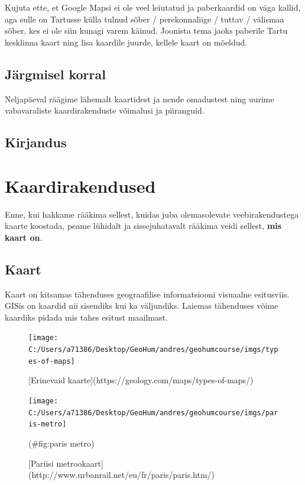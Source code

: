 \documentclass[
]{book}
\begin{document}
Kujuta ette, et Google Mapsi ei ole veel leiutatud ja paberkaardid on väga kallid, aga sulle on Tartusse külla tulnud sõber / perekonnaliige / tuttav / välismaa sõber, kes ei ole siin kunagi varem käinud. Joonista tema jaoks paberile Tartu kesklinna kaart ning lisa kaardile juurde, kellele kaart on mõeldud.

\hypertarget{juxe4rgmisel-korral-1}{%
\section{Järgmisel korral}\label{juxe4rgmisel-korral-1}}

Neljapäeval räägime lähemalt kaartidest ja nende omadustest ning uurime vabavaraliste kaardirakenduste võimalusi ja piiranguid.

\hypertarget{kirjandus-1}{%
\section{Kirjandus}\label{kirjandus-1}}

\hypertarget{kaardirakendused}{%
\chapter{Kaardirakendused}\label{kaardirakendused}}

Enne, kui hakkame rääkima sellest, kuidas juba olemasolevate veebirakendustega kaarte koostada, peame lühidalt ja sissejuhatavalt rääkima veidi sellest, \textbf{mis kaart on}.

\hypertarget{kaart}{%
\section{Kaart}\label{kaart}}

Kaart on kitsamas tähenduses geograafilise informatsiooni visuaalne esitusviis. GISis on kaardid nii sisendiks kui ka väljundiks. Laiemas tähenduses võime kaardiks pidada mis tahes esitust maailmast.

\begin{figure}

{\centering \texttt{[image: C:/Users/a71386/Desktop/GeoHum/andres/geohumcourse/imgs/types-of-maps]} 

}

\caption{[Erinevaid kaarte](https://geology.com/maps/types-of-maps/)}\label{fig:map-types}
\end{figure}

\begin{figure}

{\centering \texttt{[image: C:/Users/a71386/Desktop/GeoHum/andres/geohumcourse/imgs/paris-metro]} 

}

\caption{[Pariisi metrookaart](http://www.urbanrail.net/eu/fr/paris/paris.htm/)}(\#fig:paris metro)
\end{figure}
\end{document}

